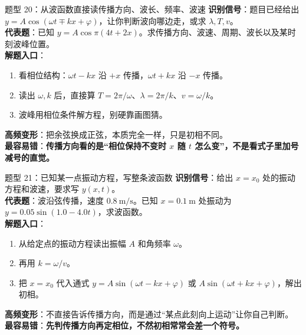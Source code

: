 \documentclass[11pt,a4paper]{ctexart}
\newcommand{\warn}[1]{\textcolor{red!70!black}{\textbf{#1}}}
\begin{document}
\begin{center}
\end{center}

\begin{typebox}{题型 20：从波函数直接读传播方向、波长、频率、波速}
\textbf{识别信号}：题目已经给出 \(y=A\cos(\omega t\mp kx+\varphi)\)，让你判断波向哪边走，或求 \(\lambda,T,v\)。\\
\textbf{代表题}：已知 \(y=A\cos\pi(4t+2x)\)。求传播方向、波速、周期、波长以及某时刻波峰位置。\\
\textbf{解题入口}：
\begin{enumerate}
  \item 看相位结构：\(\omega t-kx\) 沿 \(+x\) 传播，\(\omega t+kx\) 沿 \(-x\) 传播。
  \item 读出 \(\omega,k\) 后，直接算 \(T=2\pi/\omega\)、\(\lambda=2\pi/k\)、\(v=\omega/k\)。
  \item 波峰用相位条件解方程，别硬靠画图猜。
\end{enumerate}
\textbf{高频变形}：把余弦换成正弦，本质完全一样，只是初相不同。\\
\textbf{最容易错}：\warn{传播方向看的是“相位保持不变时 \(x\) 随 \(t\) 怎么变”，不是看式子里加号减号的直觉。}
\end{typebox}

\begin{typebox}{题型 21：已知某一点振动方程，写整条波函数}
\textbf{识别信号}：给出 \(x=x_0\) 处的振动方程和波速，要求写 \(y(x,t)\)。\\
\textbf{代表题}：波沿弦传播，速度 \(0.8\ \mathrm{m/s}\)。已知 \(x=0.1\ \mathrm{m}\) 处振动为 \(y=0.05\sin(1.0-4.0t)\)，求波函数。\\
\textbf{解题入口}：
\begin{enumerate}
  \item 从给定点的振动方程读出振幅 \(A\) 和角频率 \(\omega\)。
  \item 再用 \(k=\omega/v\)。
  \item 把 \(x=x_0\) 代入通式 \(y=A\sin(\omega t-kx+\varphi)\) 或 \(A\sin(\omega t+kx+\varphi)\)，解出初相。
\end{enumerate}
\textbf{高频变形}：不直接告诉传播方向，而是通过“某点此刻向上运动”让你自己判断。\\
\textbf{最容易错}：\warn{先判传播方向再定相位，不然初相常常会差一个符号。}
\end{typebox}
\end{document}
